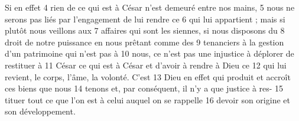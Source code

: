 Si en effet	 
4	 	rien de ce qui est à César n'est demeuré entre nos mains,	 
5	 	nous ne serons pas liés par l'engagement de lui rendre ce	 
6	 	qui lui appartient ; mais si plutôt nous veillons aux	 
7	 	affaires qui sont les siennes, si nous disposons du	 
8	 	droit de notre puissance en nous prêtant comme des	 
9	 	tenanciers à la gestion d'un patrimoine qui n'est pas à	 
10	 	nous, ce n'est pas une injustice à déplorer de restituer à	 
11	 	César ce qui est à César et d'avoir à rendre à Dieu ce	 
12	 	qui lui revient, le corps, l'âme, la volonté. C'est	 
13	 	Dieu en effet qui produit et accroît ces biens que nous	 
14	 	tenons et, par conséquent, il n'y a que justice à res-	 
15	 	tituer tout ce que l'on est à celui auquel on se rappelle	 
16	 	devoir son origine et son développement.